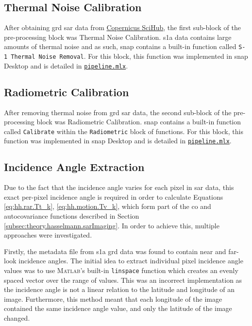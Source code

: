 \subsection{Thermal Noise Calibration} \label{subsec:systemDesign.preProcessing.thermalNoise}

After obtaining \acs{grd} \acs{sar} data from \href{scihub.copernicus.eu/dhus/#/home}{Copernicus SciHub}, the first sub-block of the pre-processing block was Thermal Noise Calibration. \acs{s1a} data contains large amounts of thermal noise and as such, \acs{snap} contains a built-in function called \lstinline{S-1 Thermal Noise Removal}. For this block, this function was implemented in \acs{snap} Desktop and is detailed in \href{https://github.com/JNSRYA006/sar-parameter-extraction-pipeline/blob/main/functions/[pipeline.mlx]}{\lstinline{pipeline.mlx}}.

\subsection{Radiometric Calibration} \label{subsec:systemDesign.preProcessing.radiometric}

After removing thermal noise from \acs{grd} \acs{sar} data, the second sub-block of the pre-processing block was Radiometric Calibration. \acs{snap} contains a built-in function called \lstinline{Calibrate} within the \lstinline{Radiometric} block of functions. For this block, this function was implemented in \acs{snap} Desktop and is detailed in \href{https://github.com/JNSRYA006/sar-parameter-extraction-pipeline/blob/main/functions/[pipeline.mlx]}{\lstinline{pipeline.mlx}}.

\subsection{Incidence Angle Extraction} \label{subsec:systemDesign.preProcessing.incidenceAngle}

Due to the fact that the incidence angle varies for each pixel in \acs{sar} data, this exact per-pixel incidence angle is required in order to calculate Equations \ref{eq:hh.rar.Tt_k}, \ref{eq:hh.motion.Tv_k}, which form part of the co and autocovariance functions described in Section \ref{subsec:theory.hasselmann.sarImaging}. In order to achieve this, multiple approaches were investigated. 

Firstly, the metadata file from \acs{s1a} \acs{grd} data was found to contain near and far-look incidence angles. The initial idea to extract individual pixel incidence angle values was to use \textsc{Matlab}'s built-in \lstinline{linspace} function which creates an evenly spaced vector over the range of values. This was an incorrect implementation as the incidence angle is not a linear relation to the latitude and longitude of an image. Furthermore, this method meant that each longitude of the image contained the same incidence angle value, and only the latitude of the image changed.

